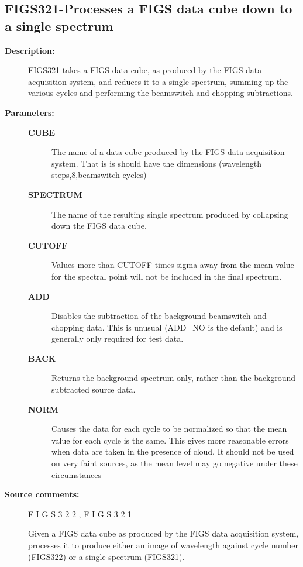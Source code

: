 \begin{description}
\subsection{FIGS321-\label{FIGS321}Processes a FIGS data cube down to a single spectrum}
\begin{description}

\item [\textbf{Description:}]
 FIGS321 takes a FIGS data cube, as produced by the FIGS data
 acquisition system, and reduces it to a single spectrum, summing
 up the various cycles and performing the beamswitch and chopping
 subtractions.

\item [\textbf{Parameters:}]
\begin{description}
\item [\textbf{CUBE}]
 The name of a data cube produced by the FIGS data
 acquisition system.  That is is should have the
 dimensions (wavelength steps,8,beamswitch cycles)
\item [\textbf{SPECTRUM}]
 The name of the resulting single spectrum
 produced by collapsing down the FIGS data cube.
\item [\textbf{CUTOFF}]
 Values more than CUTOFF times sigma away from the mean
 value for the spectral point will not be included in
 the final spectrum.
\item [\textbf{ADD}]
 Disables the subtraction of the background beamswitch
 and chopping data.  This is unusual (ADD=NO is the
 default) and is generally only required for test data.
\item [\textbf{BACK}]
 Returns the background spectrum only, rather than the
 background subtracted source data.
\item [\textbf{NORM}]
 Causes the data for each cycle to be normalized so that
 the mean value for each cycle is the same. This gives more
 reasonable errors when data are taken in the presence of
 cloud. It should not be used on very faint sources, as the
 mean level may go negative under these circumstances
\end{description}

\item [\textbf{Source comments:}]
\begin{terminalv}
 F I G S 3 2 2 ,   F I G S 3 2 1

 Given a FIGS data cube as produced by the FIGS data acquisition
 system, processes it to produce either an image of wavelength
 against cycle number (FIGS322) or a single spectrum (FIGS321).


\end{terminalv}
\end{description}
\end{description}
